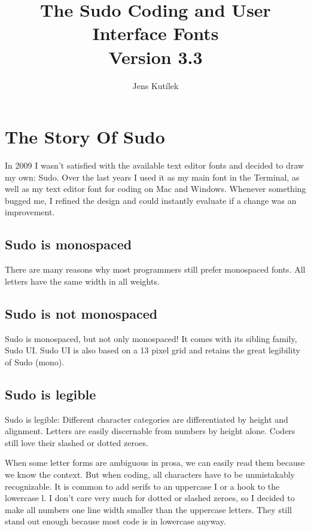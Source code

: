 \documentclass[paper=a4, 10pt]{scrbook}
\title{The Sudo Coding and User Interface Fonts\\ Version 3.3}
\author{Jens Kutílek}
\begin{document}
\maketitle

\tableofcontents

\chapter{The Story Of Sudo}

In 2009 I wasn’t satisfied with the available text editor fonts and decided to draw my own: Sudo. Over the last years I used it as my main font in the Terminal, as well as my text editor font for coding on Mac and Windows. Whenever something bugged me, I refined the design and could instantly evaluate if a change was an improvement.

\section{Sudo is mono­spaced}

There are many reasons why most programmers still prefer monospaced fonts. All letters have the same width in all weights.

\section{Sudo is not mono­spaced}
Sudo is monospaced, but not only monospaced! It comes with its sibling family, Sudo UI. Sudo UI is also based on a 13 pixel grid and retains the great legibility of Sudo (mono).

\section{Sudo is legible}
Sudo is legible: Different character categories are differentiated by height and alignment. Letters are easily discernable from numbers by height alone. Coders still love their slashed or dotted zeroes.

When some letter forms are ambiguous in prosa, we can easily read them because we know the context. But when coding, all characters have to be unmistakably recognizable. It is common to add serifs to an uppercase I or a hook to the lowercase l. I don’t care very much for dotted or slashed zeroes, so I decided to make all numbers one line width smaller than the uppercase letters. They still stand out enough because most code is in lowercase anyway.
\end{document}
